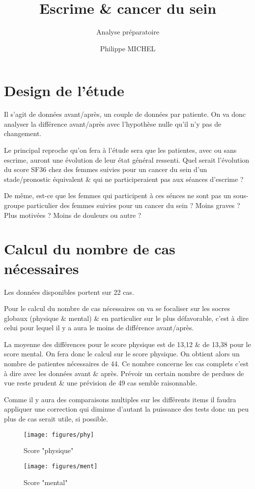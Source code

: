 \documentclass[french]{scrartcl}
\title{Escrime \& cancer du sein}
\subtitle{Analyse préparatoire}
\author{Philippe MICHEL}
\date{}
\begin{document}
\maketitle

{
\setcounter{tocdepth}{2}
}
\section*{Design de l'étude}\label{design-de-luxe9tude}

Il s'agit de données avant/après, un couple de données par patiente. On
va donc analyser la différence avant/après avec l'hypothèse nulle qu'il
n'y pas de changement.

Le principal reproche qu'on fera à l'étude sera que les patientes, avec
ou sans escrime, auront une évolution de leur état général ressenti.
Quel serait l'évolution du score SF36 chez des femmes suivies pour un
cancer du sein d'un stade/pronostic équivalent \& qui ne participeraient
pas aux séances d'escrime ?

De même, est-ce que les femmes qui participent à ces sénces ne sont pas
un sous-groupe particulier des femmes suivies pour un cancer du sein ?
Moins graves ? Plus motivées ? Moins de douleurs ou autre ?

\section*{Calcul du nombre de cas
nécessaires}

Les données disponibles portent sur 22 cas.

Pour le calcul du nombre de cas nécessaires on va se focaliser sur les
socres globaux (physique \& mental) \& en particulier sur le plus
défavorable, c'est à dire celui pour lequel il y a aura le moins de
différence avant/après.

La moyenne des différences pour le score physique est de 13,12 \& de
13,38 pour le score mental. On fera donc le calcul sur le score
physique. On obtient alors un nombre de patientes nécessaires de 44. Ce
nombre concerne les cas complets c'est à dire avec les données avant \&
après. Prévoir un certain nombre de perdues de vue reste prudent \& une
prévision de 49 cas semble raisonnable.

Comme il y aura des comparaisons multiples sur les différents items il
faudra appliquer une correction qui diminue d'autant la puissance des
tests donc un peu plus de cas serait utile, si possible.

\begin{figure}[h]
  \centering
  \texttt{[image: figures/phy]} 
  \caption{Score "physique"}
  \label{figphy}
\end{figure}

\begin{figure}[h]
  \centering
  \texttt{[image: figures/ment]} 
  \caption{Score "mental"}
  \label{figment}
\end{figure}
\end{document}
